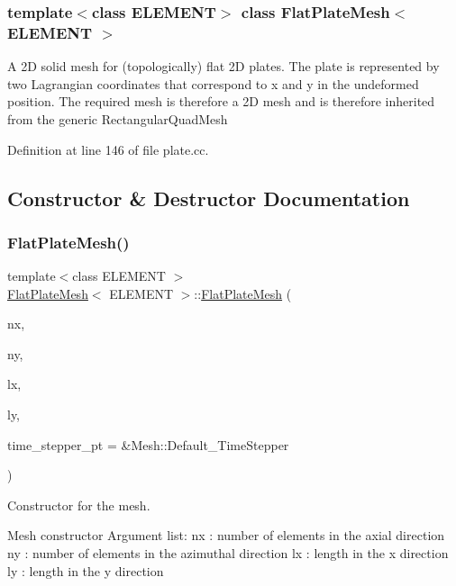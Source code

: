 \subsubsection*{template$<$class E\+L\+E\+M\+E\+NT$>$\newline
class Flat\+Plate\+Mesh$<$ E\+L\+E\+M\+E\+N\+T $>$}

A 2D solid mesh for (topologically) flat 2D plates. The plate is represented by two Lagrangian coordinates that correspond to x and y in the undeformed position. The required mesh is therefore a 2D mesh and is therefore inherited from the generic Rectangular\+Quad\+Mesh 

Definition at line 146 of file plate.\+cc.



\subsection{Constructor \& Destructor Documentation}
\mbox{\label{classFlatPlateMesh_a765cfa3692d1ab97790daf68d057a105}} 
\subsubsection{\texorpdfstring{Flat\+Plate\+Mesh()}{FlatPlateMesh()}}
{\footnotesize\ttfamily template$<$class E\+L\+E\+M\+E\+NT $>$ \\
\hyperlink{classFlatPlateMesh}{Flat\+Plate\+Mesh}$<$ E\+L\+E\+M\+E\+NT $>$\+::\hyperlink{classFlatPlateMesh}{Flat\+Plate\+Mesh} (\begin{DoxyParamCaption}\item[{const unsigned \&}]{nx,  }\item[{const unsigned \&}]{ny,  }\item[{const double \&}]{lx,  }\item[{const double \&}]{ly,  }\item[{Time\+Stepper $\ast$}]{time\+\_\+stepper\+\_\+pt = {\ttfamily \&Mesh\+:\+:Default\+\_\+TimeStepper} }\end{DoxyParamCaption})}



Constructor for the mesh. 

Mesh constructor Argument list\+: nx \+: number of elements in the axial direction ny \+: number of elements in the azimuthal direction lx \+: length in the x direction ly \+: length in the y direction 


